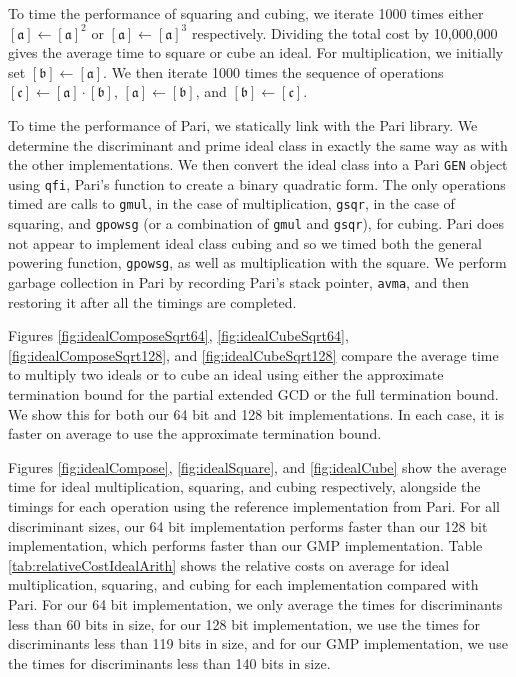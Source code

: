 \documentclass{ucalgthes1}
\theoremstyle{definition}
\newcommand{\ideal}{\mathfrak}
\newcommand{\idealclass}[1]{\left[ \ideal #1 \right]}
\newcommand{\aclass}{\idealclass a}
\newcommand{\bclass}{\idealclass b}
\newcommand{\cclass}{\idealclass c}
\begin{document}
To time the performance of squaring and cubing, we iterate 1000 times either $[\mathfrak a] \gets [\mathfrak a]^2$ or $\aclass \gets [\mathfrak a]^3$ respectively.  Dividing the total cost by 10,000,000 gives the average time to square or cube an ideal.  For multiplication, we initially set $\bclass \gets [\mathfrak a]$.  We then iterate 1000 times the sequence of operations $\cclass \gets \aclass \cdot \bclass$, $\aclass \gets \bclass$, and $\bclass \gets \cclass$.

To time the performance of Pari, we statically link with the Pari library.  We determine the discriminant and prime ideal class in exactly the same way as with the other implementations.  We then convert the ideal class into a Pari \texttt{GEN} object using \texttt{qfi}, Pari's function to create a binary quadratic form.  The only operations timed are calls to \texttt{gmul}, in the case of multiplication, \texttt{gsqr}, in the case of squaring, and \texttt{gpowsg} (or a combination of \texttt{gmul} and \texttt{gsqr}), for cubing.  Pari does not appear to implement ideal class cubing and so we timed both the general powering function, \texttt{gpowsg}, as well as multiplication with the square.  We perform garbage collection in Pari by recording Pari's stack pointer, \texttt{avma}, and then restoring it after all the timings are completed.

Figures \ref{fig:idealComposeSqrt64}, \ref{fig:idealCubeSqrt64}, \ref{fig:idealComposeSqrt128}, and \ref{fig:idealCubeSqrt128} compare the average time to multiply two ideals or to cube an ideal using either the approximate termination bound for the partial extended GCD or the full termination bound.  We show this for both our 64 bit and 128 bit implementations.  In each case, it is faster on average to use the approximate termination bound.

Figures \ref{fig:idealCompose}, \ref{fig:idealSquare}, and \ref{fig:idealCube} show the average time for ideal multiplication, squaring, and cubing respectively, alongside the timings for each operation using the reference implementation from Pari.  For all discriminant sizes, our 64 bit implementation performs faster than our 128 bit implementation, which performs faster than our GMP implementation.  Table \ref{tab:relativeCostIdealArith} shows the relative costs on average for ideal multiplication, squaring, and cubing for each implementation compared with Pari. For our 64 bit implementation, we only average the times for discriminants less than 60 bits in size, for our 128 bit implementation, we use the times for discriminants less than 119 bits in size, and for our GMP implementation, we use the times for discriminants less than 140 bits in size.
\end{document}
